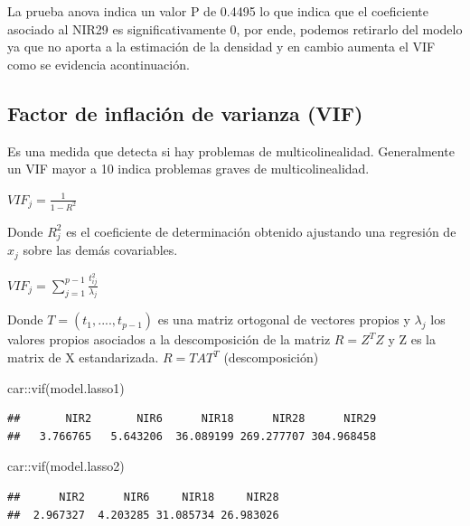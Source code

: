 \documentclass[
]{article}
\newenvironment{Shaded}{\begin{snugshade}}{\end{snugshade}}
\newcommand{\FunctionTok}[1]{\textcolor[rgb]{0.00,0.00,0.00}{#1}}
\newcommand{\NormalTok}[1]{#1}
\newcommand{\SpecialCharTok}[1]{\textcolor[rgb]{0.00,0.00,0.00}{#1}}
\begin{document}
La prueba anova indica un valor P de 0.4495 lo que indica que el
coeficiente asociado al NIR29 es significativamente 0, por ende, podemos
retirarlo del modelo ya que no aporta a la estimación de la densidad y
en cambio aumenta el VIF como se evidencia acontinuación.

\hypertarget{factor-de-inflaciuxf3n-de-varianza-vif}{%
\subsection{Factor de inflación de varianza
(VIF)}\label{factor-de-inflaciuxf3n-de-varianza-vif}}

Es una medida que detecta si hay problemas de multicolinealidad.
Generalmente un VIF mayor a 10 indica problemas graves de
multicolinealidad.

\(VIF_j = \frac{1}{1-R^2}\)

Donde \(R^2_j\) es el coeficiente de determinación obtenido ajustando
una regresión de \(x_j\) sobre las demás covariables.

\(VIF_j = \sum_{j=1}^{p-1}\frac{t^2_{ij}}{\lambda_j}\)

Donde \(T=(t_1,....,t_{p-1})\) es una matriz ortogonal de vectores
propios y \(\lambda_j\) los valores propios asociados a la
descomposición de la matriz \(R=Z^TZ\) y Z es la matrix de X
estandarizada. \(R=TAT^T\) (descomposición)

\begin{Shaded}
\begin{Highlighting}[]
\NormalTok{car}\SpecialCharTok{::}\FunctionTok{vif}\NormalTok{(model.lasso1)}
\end{Highlighting}
\end{Shaded}

\begin{verbatim}
##       NIR2       NIR6      NIR18      NIR28      NIR29 
##   3.766765   5.643206  36.089199 269.277707 304.968458
\end{verbatim}

\begin{Shaded}
\begin{Highlighting}[]
\NormalTok{car}\SpecialCharTok{::}\FunctionTok{vif}\NormalTok{(model.lasso2)}
\end{Highlighting}
\end{Shaded}

\begin{verbatim}
##      NIR2      NIR6     NIR18     NIR28 
##  2.967327  4.203285 31.085734 26.983026
\end{verbatim}
\end{document}
